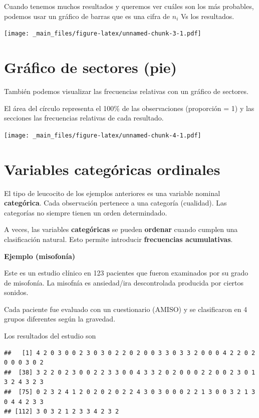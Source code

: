 \documentclass[
]{book}
\begin{document}
Cuando tenemos muchos resultados y queremos ver cuáles son los más probables, podemos usar un gráfico de barras que es una cifra de \(n_i\) Vs los resultados.

\texttt{[image: \_main\_files/figure-latex/unnamed-chunk-3-1.pdf]}

\hypertarget{gruxe1fico-de-sectores-pie}{%
\section{Gráfico de sectores (pie)}\label{gruxe1fico-de-sectores-pie}}

También podemos visualizar las frecuencias relativas con un gráfico de sectores.

El área del círculo representa el 100\% de las observaciones (proporción = 1) y las secciones las frecuencias relativas de cada resultado.

\texttt{[image: \_main\_files/figure-latex/unnamed-chunk-4-1.pdf]}

\hypertarget{variables-categuxf3ricas-ordinales}{%
\section{Variables categóricas ordinales}\label{variables-categuxf3ricas-ordinales}}

El tipo de leucocito de los ejemplos anteriores es una variable nominal \textbf{categórica}. Cada observación pertenece a una categoría (cualidad). Las categorías no siempre tienen un orden determindado.

A veces, las variables \textbf{categóricas} se pueden \textbf{ordenar} cuando cumplen una clasificación natural. Esto permite introducir \textbf{frecuencias acumulativas}.

\textbf{Ejemplo (misofonía)}

Este es un estudio clínico en 123 pacientes que fueron examinados por su grado de misofonía. La misofnía es ansiedad/ira descontrolada producida por ciertos sonidos.

Cada paciente fue evaluado con un cuestionario (AMISO) y se clasificaron en 4 grupos diferentes según la gravedad.

Los resultados del estudio son

\begin{verbatim}
##   [1] 4 2 0 3 0 0 2 3 0 3 0 2 2 0 2 0 0 3 3 0 3 3 2 0 0 0 4 2 2 0 2 0 0 0 3 0 2
##  [38] 3 2 2 0 2 3 0 0 2 2 3 3 0 0 4 3 3 2 0 2 0 0 0 2 2 0 0 2 3 0 1 3 2 4 3 2 3
##  [75] 0 2 3 2 4 1 2 0 2 0 2 0 2 2 4 3 0 3 0 0 0 2 2 1 3 0 0 3 2 1 3 0 4 4 2 3 3
## [112] 3 0 3 2 1 2 3 3 4 2 3 2
\end{verbatim}
\end{document}
